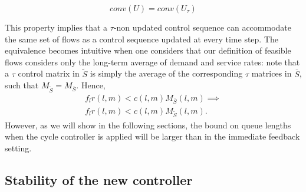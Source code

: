 \begin{Prop} \label{equality_property}
\begin{equation*} conv(U) = conv(U_{\tau}) \end{equation*}
\end{Prop}

This property implies that a $\tau$-non updated control sequence can accommodate the same set of flows as a control sequence updated at every time step. The equivalence becomes intuitive when one considers that our definition of feasible flows considers only the long-term average of demand and service rates: note that a $\tau$ control matrix in $\tilde S$ is simply the average of the corresponding $\tau$ matrices in $\overline S$, such that $M_{\tilde S} = M_{\overline S}$. Hence,
\begin{align}
f_{l} r(l,m) < c(l,m)M_{\overline{S} }(l,m) \implies \\ f_{l} r(l,m) < c(l,m)M_{\tilde{S} }(l,m). \nonumber
\end{align}
However, as we will show in the following sections, the bound on queue lengths when the cycle controller is applied will be larger than in the immediate feedback setting.






\subsection*{Stability of the new controller}




